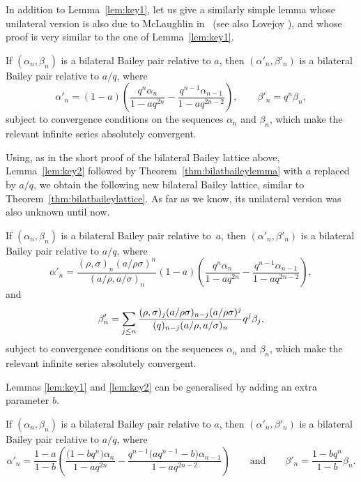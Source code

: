 In addition to Lemma~\ref{lem:key1}, let us give a similarly simple lemma whose unilateral version is also due to McLaughlin in~\cite[Lemma~13.1\,(2)]{M} (see also Lovejoy \cite[Lemma 3.1]{Lo22}), and whose proof is very similar to the one of Lemma~\ref{lem:key1}.

\begin{Lemma}\label{lem:key2}
If $(\alpha_n, \beta_n)$ is a bilateral Bailey pair relative to $a$, then $(\alpha'_n, \beta'_n)$ is a bilateral Bailey pair relative to $a/q$, where
\[%
\alpha'_n=(1-a)\left(\frac{q^n\alpha_n}{1-aq^{2n}}-\frac{q^{n-1}\alpha_{n-1}}{1-aq^{2n-2}}\right), \qquad \beta'_n=q^n\beta_n,
\]
subject to convergence conditions on the sequences $\alpha_n$ and $\beta_n$, which make the relevant infinite series absolutely convergent.
\end{Lemma}

Using, as in the short proof of the bilateral Bailey lattice above, Lemma~\ref{lem:key2} followed by Theorem~\ref{thm:bilatbaileylemma} with $a$ replaced by $a/q$, we obtain the following new bilateral Bailey lattice, similar to Theorem~\ref{thm:bilatbaileylattice}. As far as we know, its unilateral version was also unknown until now.

\begin{Theorem}\label{thm:newbilatbaileylattice}
If $(\alpha_n, \beta_n)$ is a bilateral Bailey pair relative to~$a$, then $(\alpha'_n, \beta'_n)$ is a bilateral Bailey pair relative to $a/q$, where
\begin{equation*}\alpha'_n=\frac{(\rho,\sigma)_n(a/\rho\sigma)^n}{(a/\rho,a/\sigma)_n}(1-a)\left(\frac{q^n\alpha_n}{1-aq^{2n}}-\frac{q^{n-1}\alpha_{n-1}}{1-aq^{2n-2}}\right),
\end{equation*}
and
\begin{equation*}\beta'_n=\sum_{j\leq n}{(\rho,\sigma)_j(a/\rho\sigma)_{n-j}(a/\rho\sigma)^j\over (q)_{n-j}(a/\rho,a/\sigma)_n} q^j\beta_j,
\end{equation*}
subject to convergence conditions on the sequences $\alpha_n$ and $\beta_n$, which make the relevant infinite series absolutely convergent.
\end{Theorem}

Lemmas \ref{lem:key1} and \ref{lem:key2} can be generalised by adding an extra parameter $b$.
\begin{Lemma}\label{lem:baileylattices}
If $(\alpha_n, \beta_n)$ is a bilateral Bailey pair relative to $a$, then $(\alpha'_n, \beta'_n)$ is a bilateral Bailey pair relative to $a/q$, where
\[%
\alpha'_n=\frac{1-a}{1-b}\left(\frac{\bigl(1-bq^n\bigr) \alpha_n}{1-aq^{2n}}-\frac{q^{n-1}\bigl(aq^{n-1}-b\bigr) \alpha_{n-1}}{1-aq^{2n-2}}\right)
\qquad \text{and} \qquad \beta'_n=\frac{1-bq^n}{1-b}\beta_n.
\]
\end{Lemma}

